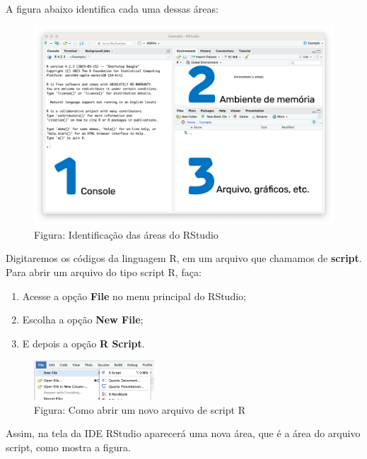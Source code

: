 \documentclass[
]{book}
\providecommand{\tightlist}{%
  \setlength{\itemsep}{0pt}\setlength{\parskip}{0pt}}
\begin{document}
A figura abaixo identifica cada uma dessas áreas:

\begin{figure}
\centering
\includegraphics{telaRStudio123.png}
\caption{Figura: Identificação das áreas do RStudio}
\end{figure}

Digitaremos os códigos da linguagem R, em um arquivo que chamamos de \textbf{script}. Para abrir um arquivo do tipo script R, faça:

\begin{enumerate}
\def\labelenumi{\arabic{enumi}.}
\tightlist
\item
  Acesse a opção \textbf{File} no menu principal do RStudio;
\item
  Escolha a opção \textbf{New File};
\item
  E depois a opção \textbf{R Script}.
\end{enumerate}

\begin{figure}
\centering
\includegraphics[width=0.4\textwidth,height=\textheight]{arquivoScript.png}
\caption{Figura: Como abrir um novo arquivo de script R}
\end{figure}

Assim, na tela da IDE RStudio aparecerá uma nova área, que é a área do arquivo script, como mostra a figura.
\end{document}
